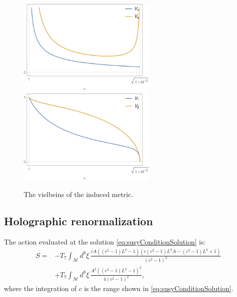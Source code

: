 \begin{figure}[t]
\begin{center}
\includegraphics[width=0.6\textwidth]{pictures/vxvc.png}
\includegraphics[width=0.6\textwidth]{pictures/v1v2.png}
\end{center}
\caption{\label{fig:vielbeins} The vielbeins of the induced metric. }
\end{figure}



\subsection{Holographic renormalization}

The action evaluated at the solution \eqref{eq:susyConditionSolution} is:
\begin{align}\label{eq:ActionAtSolution}
 S = & -T_7 \int_\mathcal{M} d^8\xi \, 
 \frac{c A \left(\left(c^2-1\right) L^2-1\right) \left(c \left(c^2-1\right) L^2 A-\left(c^2-1\right) L^2+1\right)}{\left(c^2-1\right)^3}
 \nonumber \\
     & +T_7\int _\mathcal{M} d^8\xi \, 
 \frac{A^2 \left(\left(c^2-1\right) L^2-1\right)^2}{4 \left(c^2-1\right)^2},
\end{align}
where the integration of $c$ is the range shown in \eqref{eq:susyConditionSolution}.

